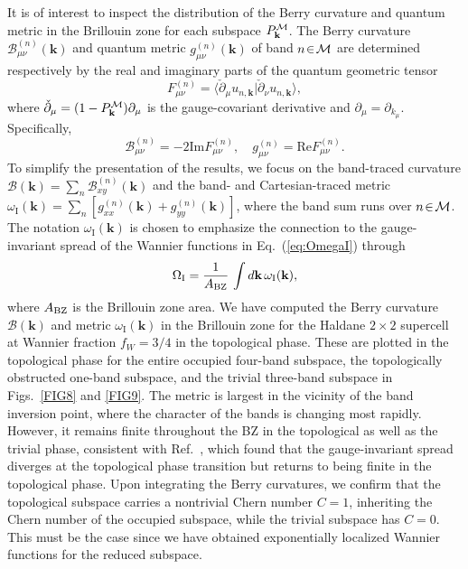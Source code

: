\documentclass[galley,aps,pra,10pt,amsmath,amssymb,
    superscriptaddress,nofootinbib,longbibliography]{revtex4-2}
\newcounter{comm}
\newcommand{\eq}[1]{Eq.~(\ref{eq:#1})}
\begin{document}
It is of interest to inspect the distribution of the Berry curvature and quantum metric in the Brillouin zone for each subspace $P_{\mathbf{k}}^{\cal M}$. The Berry curvature $\mathcal{B}^{(n)}_{\mu\nu}(\mathbf{k})$ and quantum metric $g^{(n)}_{\mu\nu}(\mathbf{k})$ of band $n\!\in\!{\cal M}$ are determined respectively by the real and imaginary parts of the quantum geometric tensor \cite{marzari1997, study1905, PATI1991105}
\begin{equation}
    F_{\mu \nu}^{(n)} = \langle \check{\partial}_{\mu} u_{n, \mathbf{k}}| \check{\partial}_{\nu} u_{n, \mathbf{k}} \rangle ,
\end{equation}
where $\check{\partial}_{\mu} = (1-P_{\mathbf{k}}^{\cal M})\partial_{\mu}$ is the gauge-covariant derivative and $\partial_{\mu} = \partial_{k_{\mu}}$. Specifically,
\begin{equation}
    \mathcal{B}_{\mu\nu}^{(n)} = -2 \text{Im}F_{\mu \nu}^{(n)}, \quad
    g_{\mu\nu}^{(n)} = \text{Re}F_{\mu\nu}^{(n)} .
\end{equation}
To simplify the presentation of the results, we focus on the band-traced curvature $\mathcal{B}(\textbf{k})=\sum_n \mathcal{B}_{xy}^{(n)}(\textbf{k})$ and the band- and Cartesian-traced metric $\omega_\textrm{I}(\textbf{k})=\sum_n [g_{xx}^{(n)}(\textbf{k})+g_{yy}^{(n)}(\textbf{k})]$, where the band sum runs over $n\!\in\!{\cal M}$. The notation $\omega_\textrm{I}(\textbf{k})$ is chosen to emphasize the connection to the gauge-invariant spread of the Wannier functions in \eq{OmegaI} through \cite{marzari1997}
\begin{equation}
\Omega_\textrm{I}=\frac{1}{A_{\rm BZ}}\,\int d\textbf{k}\, \omega_\textrm{I}(\textbf{k}),
\end{equation}
where $A_{\rm BZ}$ is the Brillouin zone area. We have computed the Berry curvature $\mathcal{B}(\textbf{k})$ and metric $\omega_\textrm{I}(\textbf{k})$ in the Brillouin zone for the Haldane $2\times2$ supercell at Wannier fraction $f_W=3/4$ in the topological phase. These are plotted in the topological phase for the entire occupied four-band subspace, the topologically obstructed one-band subspace, and the trivial three-band subspace in Figs.~\ref{FIG8} and \ref{FIG9}. The metric is largest in the vicinity of the band inversion point, where the character of the bands is changing most rapidly. However, it remains finite throughout the BZ in the topological as well as the trivial phase, consistent with Ref.~\cite{thronhauser2006}, which found that the gauge-invariant spread diverges at the topological phase transition but returns to being finite in the topological phase. Upon integrating the Berry curvatures, we confirm that the topological subspace carries a nontrivial Chern number $C=1$, inheriting the Chern number of the occupied subspace, while the trivial subspace has $C=0$. This must be the case since we have obtained exponentially localized Wannier functions for the reduced subspace. 
\end{document}
